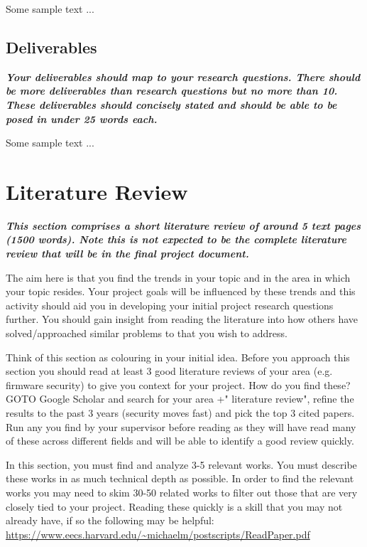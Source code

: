 \documentclass{article} %
\newcommand{\hint}[1] {\par {\bfseries \color{Blue} \it #1 \par}}
\begin{document}
Some sample text ...

\subsection{Deliverables}
\hint{Your deliverables should map to your research questions. There should be more deliverables than research questions but no more than 10. These deliverables should concisely stated and should be able to be posed in under 25 words each.}

Some sample text ...

\newpage
\section{Literature Review}
\hint{
{\color{red}This section comprises a short literature review of around 5 text pages (1500 words). Note this is not expected to be the complete literature review that will be in the final project document.}

The aim here is that you find the trends in your topic and in the area in which your topic resides. Your project goals will be influenced by these trends and this activity should aid you in  developing your initial project research questions further. You should gain insight from reading the literature into how others have solved/approached similar problems to that you wish to address. 

Think of this section as colouring in your initial idea. Before you approach this section you should read at least 3 good literature reviews of your area (e.g. firmware security) to give you context for your project. How do you find these? GOTO Google Scholar and search for your area +" literature review", refine the results to the past 3 years (security moves fast) and pick the top 3 cited papers. Run any you find by your supervisor before reading as they will have read many of these across different fields and will be able to identify a good review quickly. 

In this section, you must find and analyze 3-5 relevant works.  You must describe these works in as much technical depth as possible. In order to find the relevant works you may need to skim 30-50 related works to filter out those that are very closely tied to your project. Reading these quickly is a skill that you may not already have, if so the following may be helpful: \url{https://www.eecs.harvard.edu/~michaelm/postscripts/ReadPaper.pdf}
}
\end{document}
